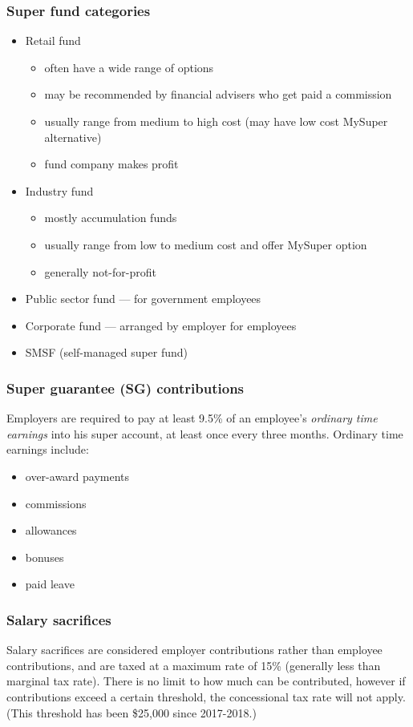\subsubsection{Super fund categories}
\begin{itemize}
	\item Retail fund
	\begin{itemize}
		\item often have a wide range of options
		\item may be recommended by financial advisers who get paid a commission
		\item usually range from medium to high cost (may have low cost MySuper alternative)
		\item fund company makes profit
	\end{itemize}
	\item Industry fund
	\begin{itemize}
		\item mostly accumulation funds
		\item usually range from low to medium cost and offer MySuper option
		\item generally not-for-profit
	\end{itemize}
	\item Public sector fund --- for government employees
 	\item Corporate fund --- arranged by employer for employees
	\item SMSF (self-managed super fund)
\end{itemize}

\subsubsection{Super guarantee (SG) contributions}
Employers are required to pay at least 9.5\% of an employee's \textit{ordinary time earnings} into his super account, at least once every three months. Ordinary time earnings include:
\begin{itemize}
	\item over-award payments
	\item commissions
	\item allowances
	\item bonuses
	\item paid leave
\end{itemize}

\subsubsection{Salary sacrifices}
Salary sacrifices are considered employer contributions rather than employee contributions, and are taxed at a maximum rate of 15\% (generally less than marginal tax rate). There is no limit to how much can be contributed, however if contributions exceed a certain threshold, the concessional tax rate will not apply. (This threshold has been \$25,000 since 2017-2018.)


